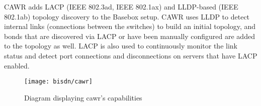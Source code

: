 \par CAWR adds LACP (IEEE 802.3ad, IEEE 802.1ax) and LLDP-based (IEEE 802.1ab) topology discovery to the Basebox setup. CAWR uses LLDP to detect internal links (connections between the switches) to build an initial topology, and bonds that are discovered via LACP or
have been manually configured are added to the topology as well. LACP is also used to continuously monitor the link status and detect port connections and disconnections on servers that have LACP enabled\cite{CITE - docs.bisdn.de}.

\begin{figure} [!htbp]
    \centering
    \texttt{[image: bisdn/cawr]}
    \caption{Diagram displaying cawr's capabilities}
\end{figure}
